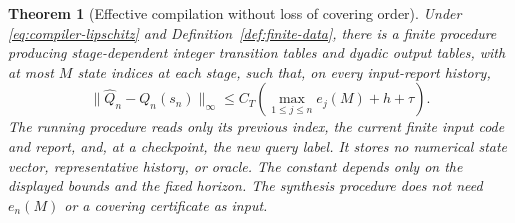 \documentclass[11pt]{amsart}
\newtheorem{theorem}{Theorem}[section]
\theoremstyle{definition}\newtheorem{definition}[theorem]{Definition}
\theoremstyle{remark}\newtheorem{remark}[theorem]{Remark}
\begin{document}
\begin{theorem}[Effective compilation without loss of covering order]
\label{thm:compact-compiler}
Under \eqref{eq:compiler-lipschitz} and Definition~\ref{def:finite-data},
there is a finite procedure producing stage-dependent integer transition
tables and dyadic output tables, with at most $M$ state indices at each
stage, such that, on every input-report history,
\begin{equation}\label{eq:compiler-bound}
 \|\widehat Q_n-Q_n(s_n)\|_\infty
 \le C_T\left(\max_{1\le j\le n}e_j(M)+h+\tau\right).
\end{equation}
The running procedure reads only its previous index, the current finite
input code and report, and, at a checkpoint, the new query label. It
stores no numerical state vector, representative history, or oracle.
The constant depends only on the displayed bounds and the fixed horizon.
The synthesis procedure does not need $e_n(M)$ or a covering certificate
as input.
\end{theorem}
\end{document}
